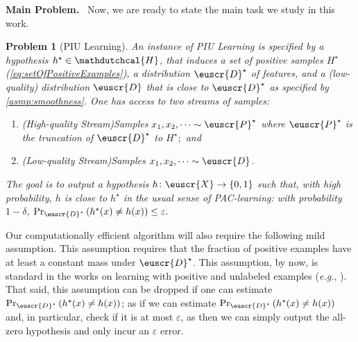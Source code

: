 \documentclass[11pt]{article}
\theoremstyle{plain}
\newtheorem{problem}{Problem}
\theoremstyle{definition}
\theoremstyle{remark}
\newcommand{\inbrace}[1]{\left\{#1\right\}}
\newcommand{\inparen}[1]{\left(#1\right)}
\newcommand{\zo}{\ensuremath{\inbrace{0, 1}}}
\newcommand{\eps}{\varepsilon}
\newcommand{\customcal}[1]{\euscr{#1}}
\newcommand{\cD}{\customcal{D}}
\newcommand{\cP}{\customcal{P}}
\newcommand{\cX}{\customcal{X}}
\renewcommand{\paragraph}[1]{\medskip \noindent\textbf{#1}~}
\newcommand{\eg}{\textit{e.g.}}
\newcommand{\hypo}[1]{\mathdutchcal{#1}}
\newcommand{\hyH}{\hypo{H}}
\newcommand{\optset}{{H^\star}}
\newcommand{\cDtrue}{\cD^\star}
\newcommand{\cDgiven}{\cD}
\newcommand{\cPtrue}{\cP^\star}
\begin{document}
        
        \paragraph{Main Problem.}
        Now, we are ready to state the main task we study in this work.
        \begin{problem}[PIU Learning]\label{prob:PUlearning}
            An instance of PIU Learning is specified by a hypothesis $h^\star\in \hyH$, that induces a set of positive samples $\optset$ (\cref{eq:setOfPositiveExamples}), a distribution $\cDtrue$ of features, and a (low-quality) distribution $\cDgiven$ that is close to $\cDtrue$ as specified by \cref{asmp:smoothness}.
            One has access to two streams of samples:
            \begin{enumerate}
                \item \emph{(High-quality Stream)}\quad Samples $x_1,x_2,\dots \sim \cPtrue$ where $\cPtrue$ is the truncation of $\cDtrue$ to $\optset;$ and 
                \item \emph{(Low-quality Stream)}\quad Samples $x_1,x_2,\dots \sim \cDgiven$. 
            \end{enumerate}
            The goal is to output a hypothesis $h\colon \cX\to \zo$ such that, with high probability, $h$ is close to $h^\star$ in the usual sense of PAC-learning: with probability $1-\delta$, $\Pr_{\cDtrue}\inparen{h^\star(x)\neq h(x)} \leq \eps.$
        \end{problem}
        Our computationally efficient algorithm  will also require the following mild assumption.
        \posFraction*
        \noindent This assumption requires that the fraction of positive examples have at least a constant mass under $\cDtrue$.
        This assumption, by now, is standard in the works on learning with positive and unlabeled examples (\eg{}, \cite{lee2024unknown}). %
        That said, this assumption can be dropped if one can estimate $\Pr_{\cDtrue}\inparen{h^\star(x)\neq h(x)}$; as if we can estimate $\Pr_{\cDtrue}\inparen{h^\star(x)\neq h(x)}$ and, in particular, check if it is at most $\eps$, as then we can simply output the all-zero hypothesis and only incur an $\eps$ error.
            
\end{document}
